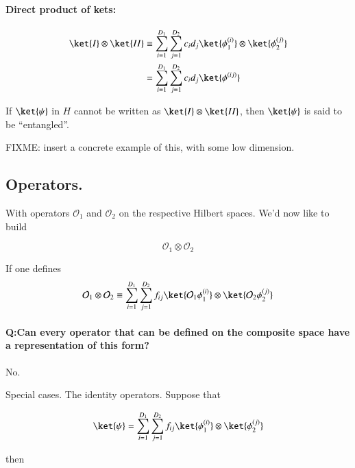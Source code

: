 \paragraph{Direct product of kets:}

\begin{align*}
\ket{I} \otimes \ket{II} 
&\equiv
\sum_{i = 1}^{D_1}
\sum_{j = 1}^{D_2}
c_i d_j
\ket{ \phi_1^{(i)}} \otimes \ket{ \phi_2^{(j)}} \\
&=
\sum_{i = 1}^{D_1}
\sum_{j = 1}^{D_2}
c_i d_j
\ket{ \phi^{(ij)}} 
\end{align*}

If $\ket{\psi}$ in $H$ cannot be written as $\ket{I} \otimes \ket{II}$, then $\ket{\psi}$ is said to be ``entangled''.

FIXME: insert a concrete example of this, with some low dimension.

\subsection{Operators.}

With operators $\mathcal{O}_1$ and $\mathcal{O}_2$ on the respective Hilbert spaces.  We'd now like to build 

\begin{equation}\label{eqn:qmTwoL1:230}
\mathcal{O}_1 \otimes \mathcal{O}_2
\end{equation}

If one defines
\begin{equation}\label{eqn:qmTwoL1:250}
\mathcal{O}_1 \otimes \mathcal{O}_2
\equiv
\sum_{i = 1}^{D_1}
\sum_{j = 1}^{D_2}
f_{ij}
\ket{ \mathcal{O}_1 \phi_1^{(i)}} \otimes \ket{ \mathcal{O}_2 \phi_2^{(j)}} 
\end{equation}

\paragraph{Q:Can every operator that can be defined on the composite space have a representation of this form?}

No.

Special cases.  The identity operators.  Suppose that 

\begin{equation}\label{eqn:qmTwoL1:270}
\ket{\psi}
=
\sum_{i = 1}^{D_1}
\sum_{j = 1}^{D_2}
f_{ij}
\ket{ \phi_1^{(i)}} \otimes \ket{ \phi_2^{(j)}} 
\end{equation}

then

